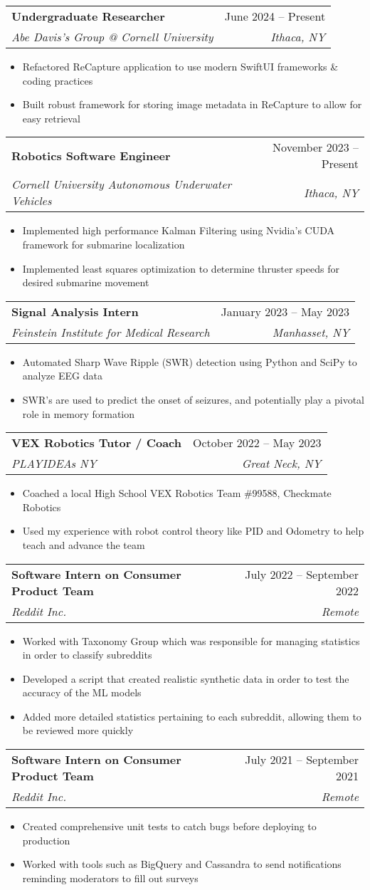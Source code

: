 \documentclass[letterpaper,11pt]{article}
\makeatletter
\newcommand{\resumeItem}[1]{
  \item\small{
    {#1 \vspace{-2pt}}
  }
}
\newcommand{\resumeSubheading}[4]{
  \vspace{2pt}\item
    \begin{tabular*}{0.97\textwidth}[t]{l@{\extracolsep{\fill}}r}
      \textbf{#1} & #2 \\
      \textit{\small#3} & \textit{\small #4} \\
    \end{tabular*}\vspace{-8pt}
}
\newcommand{\resumeItemListStart}{\begin{itemize}}
\newcommand{\resumeItemListEnd}{\end{itemize}\vspace{-5pt}}
\makeatother
\begin{document}
    \resumeSubheading
      {Undergraduate Researcher}{June 2024 -- Present}
      {Abe Davis's Group @ Cornell University}{Ithaca, NY}
      \resumeItemListStart
        \resumeItem{Refactored ReCapture application to use modern SwiftUI frameworks \& coding practices}
        \resumeItem{Built robust framework for storing image metadata in ReCapture to allow for easy retrieval}
      \resumeItemListEnd
      
    \resumeSubheading
      {Robotics Software Engineer}{November 2023 -- Present}
      {Cornell University Autonomous Underwater Vehicles}{Ithaca, NY}
      \resumeItemListStart
        \resumeItem{Implemented high performance Kalman Filtering using Nvidia's CUDA framework for submarine localization}
        \resumeItem{Implemented least squares optimization to determine thruster speeds for desired submarine movement}
    \resumeItemListEnd

    \resumeSubheading
      {Signal Analysis Intern}{January 2023 -- May 2023}
      {Feinstein Institute for Medical Research}{Manhasset, NY}
      \resumeItemListStart
      \resumeItem{Automated Sharp Wave Ripple (SWR) detection using Python and SciPy to analyze EEG data}
      \resumeItem{SWR’s are used to predict the onset of seizures, and potentially play a pivotal role in memory formation}
    \resumeItemListEnd

    \resumeSubheading
      {VEX Robotics Tutor / Coach}{October 2022 -- May 2023}
      {PLAYIDEAs NY}{Great Neck, NY}
      \resumeItemListStart
      \resumeItem{Coached a local High School VEX Robotics Team \#99588, Checkmate Robotics}
      \resumeItem{Used my experience with robot control theory like PID and Odometry to help teach and advance the team}
    \resumeItemListEnd

    \resumeSubheading
      {Software Intern on Consumer Product Team}{July 2022 -- September 2022}
      {Reddit Inc.}{Remote}
      \resumeItemListStart
      \resumeItem{Worked with Taxonomy Group which was responsible for managing statistics in order to classify subreddits}
      \resumeItem{Developed a script that created realistic synthetic data in order to test the accuracy of the ML models}
      \resumeItem{Added more detailed statistics pertaining to each subreddit, allowing them to be reviewed more quickly}
    \resumeItemListEnd

    \resumeSubheading
      {Software Intern on Consumer Product Team}{July 2021 -- September 2021}
      {Reddit Inc.}{Remote}
      \resumeItemListStart
      \resumeItem{Created comprehensive unit tests to catch bugs before deploying to production}
      \resumeItem{Worked with tools such as BigQuery and Cassandra to send notifications reminding moderators to fill out surveys}
    \resumeItemListEnd
\end{document}
